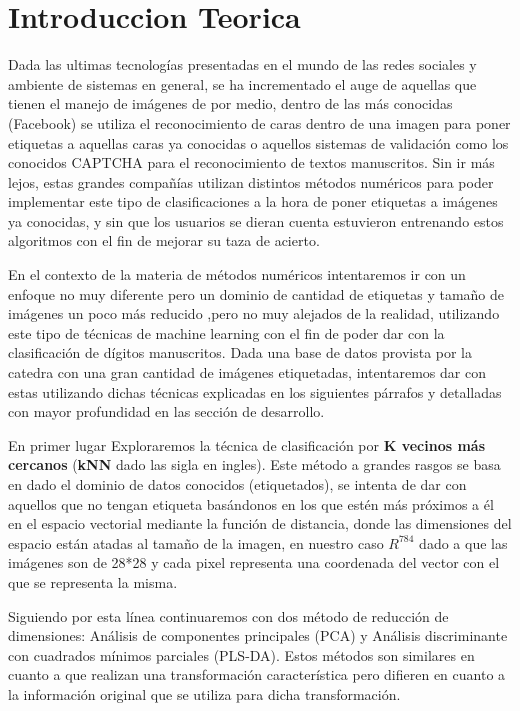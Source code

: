 \section{Introduccion Teorica}
Dada las ultimas tecnologías presentadas en el mundo de las redes sociales y ambiente de sistemas en general, se ha incrementado el auge de aquellas que tienen el manejo de imágenes de por medio, dentro de las más conocidas (Facebook) se utiliza el reconocimiento de caras dentro de una imagen para poner etiquetas a aquellas caras ya conocidas o aquellos sistemas de validación como los conocidos CAPTCHA para el reconocimiento de textos manuscritos. Sin ir más lejos, estas grandes compañías utilizan distintos métodos numéricos para poder implementar este tipo de clasificaciones a la hora de poner etiquetas a imágenes ya conocidas, y sin que los usuarios se dieran cuenta estuvieron entrenando estos algoritmos con el fin de mejorar su taza de acierto. 

En el contexto de la materia de métodos numéricos intentaremos ir con un enfoque no muy diferente pero un dominio de cantidad de etiquetas y tamaño de imágenes un poco más reducido ,pero no muy alejados de la realidad, utilizando este tipo de técnicas de machine learning con el fin de poder dar con la clasificación de dígitos manuscritos. Dada una base de datos provista por la catedra con una gran cantidad de imágenes etiquetadas, intentaremos dar con estas utilizando dichas técnicas explicadas en los siguientes párrafos y detalladas con mayor profundidad en las sección de desarrollo. 

En primer lugar Exploraremos la técnica de clasificación por \textbf{K vecinos más cercanos} (\textbf{kNN} dado las sigla en ingles). Este método a grandes rasgos se basa en dado el dominio de datos conocidos (etiquetados), se intenta de dar con aquellos que no tengan etiqueta basándonos en los que estén más próximos a él en el espacio vectorial mediante la función de distancia, donde las dimensiones del espacio están atadas al tamaño de la imagen, en nuestro caso $R^784$ dado a que las imágenes son de 28*28 y cada pixel representa una coordenada del vector con el que se representa la misma.

Siguiendo por esta línea continuaremos con dos método de reducción de dimensiones: Análisis de componentes principales (PCA) y Análisis discriminante con cuadrados mínimos parciales (PLS-DA). Estos métodos son similares en cuanto a que realizan una transformación característica pero difieren en cuanto a la información original que se utiliza para dicha transformación. 

